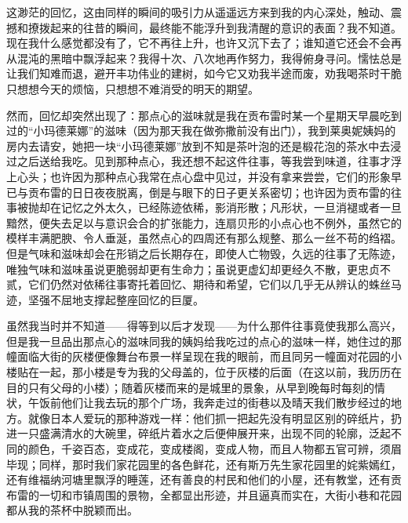 \par 这渺茫的回忆，这由同样的瞬间的吸引力从遥遥远方来到我的内心深处，触动、震撼和撩拨起来的往昔的瞬间，最终能不能浮升到我清醒的意识的表面？我不知道。现在我什么感觉都没有了，它不再往上升，也许又沉下去了；谁知道它还会不会再从混沌的黑暗中飘浮起来？我得十次、八次地再作努力，我得俯身寻问。懦怯总是让我们知难而退，避开丰功伟业的建树，如今它又劝我半途而废，劝我喝茶时干脆只想想今天的烦恼，只想想不难消受的明天的期望。
\par 然而，回忆却突然出现了：那点心的滋味就是我在贡布雷时某一个星期天早晨吃到过的“小玛德莱娜”的滋味（因为那天我在做弥撒前没有出门），我到莱奥妮姨妈的房内去请安，她把一块“小玛德莱娜”放到不知是茶叶泡的还是椴花泡的茶水中去浸过之后送给我吃。见到那种点心，我还想不起这件往事，等我尝到味道，往事才浮上心头；也许因为那种点心我常在点心盘中见过，并没有拿来尝尝，它们的形象早已与贡布雷的日日夜夜脱离，倒是与眼下的日子更关系密切；也许因为贡布雷的往事被抛却在记忆之外太久，已经陈迹依稀，影消形散；凡形状，一旦消褪或者一旦黯然，便失去足以与意识会合的扩张能力，连扇贝形的小点心也不例外，虽然它的模样丰满肥腴、令人垂涎，虽然点心的四周还有那么规整、那么一丝不苟的绉褶。但是气味和滋味却会在形销之后长期存在，即使人亡物毁，久远的往事了无陈迹，唯独气味和滋味虽说更脆弱却更有生命力；虽说更虚幻却更经久不散，更忠贞不贰，它们仍然对依稀往事寄托着回忆、期待和希望，它们以几乎无从辨认的蛛丝马迹，坚强不屈地支撑起整座回忆的巨厦。
\par 虽然我当时并不知道——得等到以后才发现——为什么那件往事竟使我那么高兴，但是我一旦品出那点心的滋味同我的姨妈给我吃过的点心的滋味一样，她住过的那幢面临大街的灰楼便像舞台布景一样呈现在我的眼前，而且同另一幢面对花园的小楼贴在一起，那小楼是专为我的父母盖的，位于灰楼的后面（在这以前，我历历在目的只有父母的小楼）；随着灰楼而来的是城里的景象，从早到晚每时每刻的情状，午饭前他们让我去玩的那个广场，我奔走过的街巷以及晴天我们散步经过的地方。就像日本人爱玩的那种游戏一样：他们抓一把起先没有明显区别的碎纸片，扔进一只盛满清水的大碗里，碎纸片着水之后便伸展开来，出现不同的轮廓，泛起不同的颜色，千姿百态，变成花，变成楼阁，变成人物，而且人物都五官可辨，须眉毕现；同样，那时我们家花园里的各色鲜花，还有斯万先生家花园里的姹紫嫣红，还有维福纳河塘里飘浮的睡莲，还有善良的村民和他们的小屋，还有教堂，还有贡布雷的一切和市镇周围的景物，全都显出形迹，并且逼真而实在，大街小巷和花园都从我的茶杯中脱颖而出。



